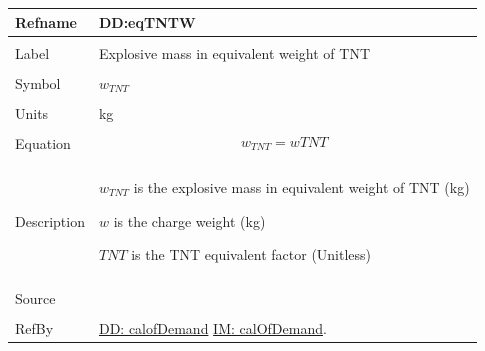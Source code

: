\documentclass[12pt]{article}
\begin{document}
\noindent \begin{minipage}{\textwidth}
\begin{tabular}{p{} p{}}
\toprule \textbf{Refname} & \textbf{DD:eqTNTW}
\label{DD:eqTNTW}
\\ \midrule \\
Label & Explosive mass in equivalent weight of TNT
        \\ \midrule \\
        Symbol & ${w_{TNT}}$
                 \\ \midrule \\
                 Units & kg
                         \\ \midrule \\
                         Equation & \begin{displaymath}
                                    {w_{TNT}}=w TNT
                                    \end{displaymath}
                                    \\ \midrule \\
                                    Description & \begin{symbDescription}
                                                  \item{${w_{TNT}}$ is the explosive mass in equivalent weight of TNT (kg)}
                                                  \item{$w$ is the charge weight (kg)}
                                                  \item{$TNT$ is the TNT equivalent factor (Unitless)}
                                                  \end{symbDescription}
                                                  \\ \midrule \\
                                                  Source & \cite{astm2009}
                                                           \\ \midrule \\
                                                           RefBy & \hyperref[DD:calofDemand]{DD: calofDemand} \hyperref[IM:calOfDemand]{IM: calOfDemand}.
\\ \bottomrule \end{tabular}
\end{minipage}
\par~
\end{document}
